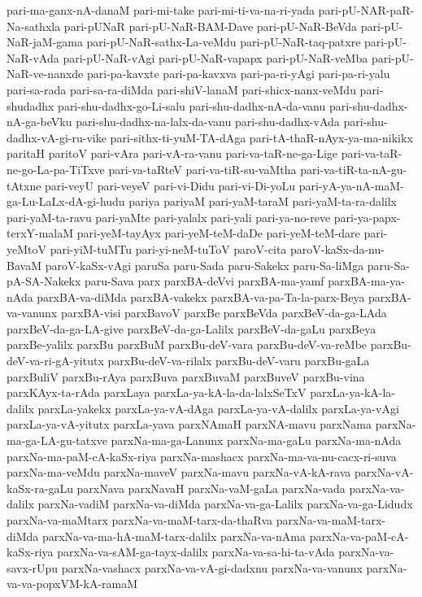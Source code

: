 {pari-ma-ganx-nA-danaM
pari-mi-take
pari-mi-ti-va-na-ri-yada
pari-pU-NAR-paR-Na-sathxla
pari-pUNaR
pari-pU-NaR-BAM-Dave
pari-pU-NaR-BeVda
pari-pU-NaR-jaM-gama
pari-pU-NaR-sathx-La-veMdu
pari-pU-NaR-taq-patxre
pari-pU-NaR-vAda
pari-pU-NaR-vAgi
pari-pU-NaR-vapapx
pari-pU-NaR-veMba
pari-pU-NaR-ve-nanxde
pari-pa-kavxte
pari-pa-kavxva
pari-pa-ri-yAgi
pari-pa-ri-yalu
pari-sa-rada
pari-sa-ra-diMda
pari-shiV-lanaM
pari-shicx-nanx-veMdu
pari-shudadhx
pari-shu-dadhx-go-Li-salu
pari-shu-dadhx-nA-da-vanu
pari-shu-dadhx-nA-ga-beVku
pari-shu-dadhx-na-lalx-da-vanu
pari-shu-dadhx-vAda
pari-shu-dadhx-vA-gi-ru-vike
pari-sithx-ti-yuM-TA-dAga
pari-tA-thaR-nAyx-ya-ma-nikikx
paritaH
paritoV
pari-vAra
pari-vA-ra-vanu
pari-va-taR-ne-ga-Lige
pari-va-taR-ne-go-La-pa-TiTxve
pari-va-taRteV
pari-va-tiR-su-vaMtha
pari-va-tiR-ta-nA-gu-tAtxne
pari-veyU
pari-veyeV
pari-vi-Didu
pari-vi-Di-yoLu
pari-yA-ya-nA-maM-ga-Lu-LaLx-dA-gi-hudu
pariya
pariyaM
pari-yaM-taraM
pari-yaM-ta-ra-dalilx
pari-yaM-ta-ravu
pari-yaMte
pari-yalalx
pari-yali
pari-ya-no-reve
pari-ya-papx-terxY-malaM
pari-yeM-tayAyx
pari-yeM-teM-daDe
pari-yeM-teM-dare
pari-yeMtoV
pari-yiM-tuMTu
pari-yi-neM-tuToV
paroV-cita
paroV-kaSx-da-nu-BavaM
paroV-kaSx-vAgi
paruSa
paru-Sada
paru-Sakekx
paru-Sa-liMga
paru-Sa-pA-SA-Nakekx
paru-Sava
parx
parxBA-deVvi
parxBA-ma-yamf
parxBA-ma-ya-nAda
parxBA-va-diMda
parxBA-vakekx
parxBA-va-pa-Ta-la-parx-Beya
parxBA-va-vanunx
parxBA-visi
parxBavoV
parxBe
parxBeVda
parxBeV-da-ga-LAda
parxBeV-da-ga-LA-give
parxBeV-da-ga-Lalilx
parxBeV-da-gaLu
parxBeya
parxBe-yalilx
parxBu
parxBuM
parxBu-deV-vara
parxBu-deV-va-reMbe
parxBu-deV-va-ri-gA-yitutx
parxBu-deV-va-rilalx
parxBu-deV-varu
parxBu-gaLa
parxBuliV
parxBu-rAya
parxBuva
parxBuvaM
parxBuveV
parxBu-vina
parxKAyx-ta-rAda
parxLaya
parxLa-ya-kA-la-da-lalxSeTxV
parxLa-ya-kA-la-dalilx
parxLa-yakekx
parxLa-ya-vA-dAga
parxLa-ya-vA-dalilx
parxLa-ya-vAgi
parxLa-ya-vA-yitutx
parxLa-yava
parxNAmaH
parxNA-mavu
parxNama
parxNa-ma-ga-LA-gu-tatxve
parxNa-ma-ga-Lanunx
parxNa-ma-gaLu
parxNa-ma-nAda
parxNa-ma-paM-cA-kaSx-riya
parxNa-mashacx
parxNa-ma-va-nu-cacx-ri-suva
parxNa-ma-veMdu
parxNa-maveV
parxNa-mavu
parxNa-vA-kA-rava
parxNa-vA-kaSx-ra-gaLu
parxNava
parxNavaH
parxNa-vaM-gaLa
parxNa-vada
parxNa-va-dalilx
parxNa-vadiM
parxNa-va-diMda
parxNa-va-ga-Lalilx
parxNa-va-ga-Lidudx
parxNa-va-maMtarx
parxNa-va-maM-tarx-da-thaRva
parxNa-va-maM-tarx-diMda
parxNa-va-ma-hA-maM-tarx-dalilx
parxNa-va-nAma
parxNa-va-paM-cA-kaSx-riya
parxNa-va-sAM-ga-tayx-dalilx
parxNa-va-sa-hi-ta-vAda
parxNa-va-savx-rUpu
parxNa-vashacx
parxNa-va-vA-gi-dadxnu
parxNa-va-vanunx
parxNa-va-va-popxVM-kA-ramaM
}
